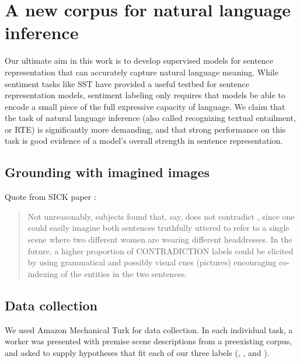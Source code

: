 \section{A new corpus for natural language inference}\label{sec:discussion}


Our ultimate aim in this work is to develop supervised models for sentence representation that can accurately capture natural language meaning. While sentiment tasks like SST have provided a useful testbed for sentence representation models, sentiment labeling only requires that models be able to encode a small piece of the full expressive capacity of language. We claim that the task of natural language inference (also called recognizing textual entailment, or RTE) is significantly more demanding, and that strong performance on this task is good evidence of a model's overall strength in sentence representation.

\subsection{Grounding with imagined images}


Quote from SICK paper \cite{marelli2014sick}:

\begin{quote}
Not unreasonably, subjects found that, say,  does not contradict , since one could easily imagine both sentences truthfully uttered to refer to a single scene where two different women are wearing different headdresses. In the future, a higher proportion of CONTRADICTION labels could be elicited by using grammatical and possibly visual cues (pictures) encouraging co-indexing of the entities in the two sentences.
\end{quote}

\subsection{Data collection}

We used Amazon Mechanical Turk for data collection. In each individual task, a worker was presented with premise scene descriptions from a preexisting corpus, and asked to supply hypotheses that fit each of our three labels (, , and ).

